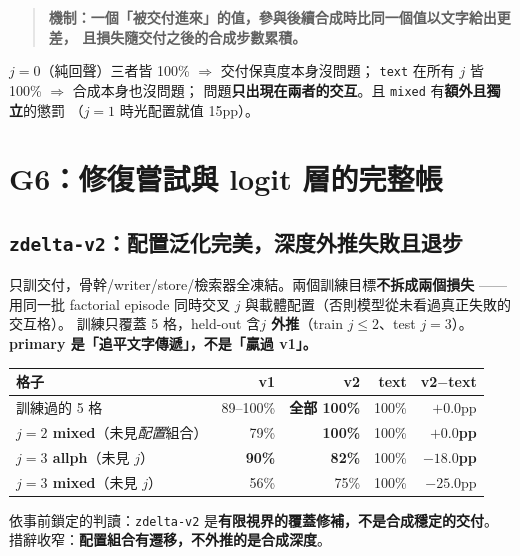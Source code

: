 \documentclass[11pt, a4paper]{article}
\begin{document}
\begin{quote}
\textbf{機制：一個「被交付進來」的值，參與後續合成時比同一個值以文字給出更差，
且損失隨交付之後的合成步數累積。}
\end{quote}

$j{=}0$（純回聲）三者皆 100\% $\Rightarrow$ 交付保真度本身沒問題；
\verb|text| 在所有 $j$ 皆 100\% $\Rightarrow$ 合成本身也沒問題；
問題\textbf{只出現在兩者的交互}。且 \verb|mixed| 有\textbf{額外且獨立}的懲罰
（$j{=}1$ 時光配置就值 15pp）。

\section{G6：修復嘗試與 logit 層的完整帳}\label{sec:g6}

\subsection{\texttt{zdelta-v2}：配置泛化完美，深度外推失敗且退步}

只訓交付，骨幹/writer/store/檢索器全凍結。兩個訓練目標\textbf{不拆成兩個損失} ——
用同一批 factorial episode 同時交叉 $j$ 與載體配置（否則模型從未看過真正失敗的交互格）。
訓練只覆蓋 5 格，held-out 含\textbf{$j$ 外推}（train $j \leq 2$、test $j{=}3$）。
\textbf{primary 是「追平文字傳遞」，不是「贏過 v1」。}

\begin{table}[h]
\centering
\small
\begin{tabular}{lrrrr}
\toprule
格子 & v1 & \textbf{v2} & text & v2$-$text \\
\midrule
訓練過的 5 格 & 89--100\% & \textbf{全部 100\%} & 100\% & $+0.0$pp \\
\textbf{$j{=}2$ mixed}（未見\emph{配置}組合）& 79\% & \textbf{100\%} & 100\% & \textbf{$+0.0$pp} \\
\textbf{$j{=}3$ allph}（未見 $j$）& \textbf{90\%} & \textbf{82\%} & 100\% & \textbf{$-18.0$pp} \\
\textbf{$j{=}3$ mixed}（未見 $j$）& 56\% & 75\% & 100\% & $-25.0$pp \\
\bottomrule
\end{tabular}
\end{table}

依事前鎖定的判讀：\texttt{zdelta-v2} 是\textbf{有限視界的覆蓋修補，不是合成穩定的交付}。
措辭收窄：\textbf{配置組合有遷移，不外推的是合成深度}。
\end{document}

